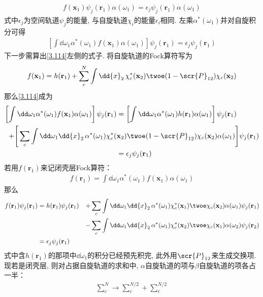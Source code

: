 \begin{align}\label{3.113}
	f(\mathbf{x}_1)\psi_j(\mathbf{r}_1)\alpha(\omega_1) = \epsilon_j\psi_j(\mathbf{r}_1)\alpha(\omega_1)
\end{align}
式中$\epsilon_j$为空间轨道$\psi_j$的能量, 
与自旋轨道$\chi_i$的能量$\epsilon_i$相同. 
左乘$\alpha^*(\omega_1)$并对自旋积分可得
\begin{align}
	\label{3.114}
	\left[ \int\dd\omega_1\alpha^*(\omega_1)f(\mathbf{x}_1)\alpha(\omega_1) \right]\psi_j(\mathbf{r}_1) = \epsilon_j\psi_j(\mathbf{r}_1)
\end{align}
下一步需算出\autoref{3.114}左侧的式子. 
将自旋轨道的Fock算符写为
\begin{align}\label{3.115}
	f(\mathbf{x}_1) = h(\mathbf{r}_1) + \sum_c^N\int\dd{x}_2\,\chi_c^*(\mathbf{x}_2)\twoe(1-\scr{P}_{12})\chi_c(\mathbf{x}_2)
\end{align}
那么\autoref{3.114}成为
\begin{align}
	\left[ \int\dd\omega_1\alpha^*(\omega_1)f(\mathbf{x}_1)\alpha(\omega_1) \right]\psi_j(\mathbf{r}_1) &= \left[ \int\dd\omega_1\alpha^*(\omega_1)h(\mathbf{r}_1)\alpha(\omega_1) \right]\psi_j(\mathbf{r}_1) \notag\\
	+\Bigg[ \sum_c\int\dd\omega_1\dd{x}_2\,\alpha^*(\omega_1)\chi_c^*(&\mathbf{x}_2)\twoe(1-\scr{P}_{12})\chi_c(\mathbf{x}_2)\alpha(\omega_1) \Bigg]\psi_j(\mathbf{r}_1)  \notag\\
	& = \epsilon_j\psi_j(\mathbf{r}_1)
\end{align}
若用$f(\mathbf{r}_1)$来记闭壳层Fock算符：
\begin{align}
	f(\mathbf{r}_1) = \int\dd\omega_1\alpha^*(\omega_1)f(\mathbf{x}_1)\alpha(\omega_1)
\end{align}
那么
\begin{alignat}{3}
	f(\mathbf{r}_1)\psi_j(\mathbf{r}_1) &= h(\mathbf{r}_1)\psi_j(\mathbf{r}_1) &+ \sum_c\int\dd\omega_1\dd{x}_2\,\alpha^*(\omega_1)\chi_c^*(\mathbf{x}_1)\twoe\chi_c(\mathbf{x}_2)\alpha(\omega_1)\psi_j(\mathbf{r}_1)\notag\\
	&&-\sum_c\int\dd\omega_1\dd{x}_2\,\alpha^*(\omega_1)\chi_c^*(\mathbf{x}_2)\twoe\chi_c(\mathbf{x}_1)\alpha(\omega_2)\psi_j(\mathbf{r}_2)\notag\\
	&=\epsilon_j\psi_j(\mathbf{r}_1)&
\end{alignat}
式中含$h(\mathbf{r}_1)$的那项中$\dd\omega_1$的积分已经预先积完, 
此外用$\scr{P}_{12}$来生成交换项. 
现若是闭壳层, 
则对占据自旋轨道的求和中, 
$\alpha$自旋轨道的项与$\beta$自旋轨道的项各占一半：
\begin{align}
	\sum_c^N\to \sum_c^{N/2} + \sum_c^{N/2}
\end{align}
